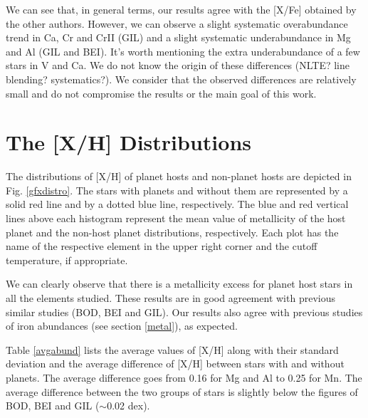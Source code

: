 \documentclass[dvips,12pt,a4paper]{report}
\begin{document}
{{We can see that, in general terms, our results agree with the [X/Fe] obtained by the other authors. However, we can observe a slight systematic overabundance trend in Ca, Cr and CrII (GIL) and a slight systematic underabundance in Mg and Al (GIL and BEI). It's worth mentioning the extra underabundance of a few stars in V and Ca. We do not know the origin of these differences (NLTE? line blending? systematics?). We consider that the observed differences are relatively small and do not compromise the results or the main goal of this work. 







\section{The [X/H] Distributions} 

The distributions of [X/H] of planet hosts and non-planet hosts are depicted in Fig. \ref{gfxdistro}. The stars with planets and without them are represented by a solid red line and by a dotted blue line, respectively. The blue and red vertical lines above each histogram represent the mean value of metallicity of the host planet and the non-host planet distributions, respectively. Each plot has the name of the respective element in the upper right corner and the cutoff temperature, if appropriate.

We can clearly observe that there is a metallicity excess for planet host stars in all the elements studied. These results are in good agreement with previous similar studies (BOD, BEI and GIL). Our results also agree with previous studies of iron abundances (see section \ref{metal}), as expected.

Table \ref{avgabund} lists the average values of [X/H] along with their standard deviation and the average difference of [X/H] between stars with and without planets. The average difference goes from 0.16 for Mg and Al to 0.25 for Mn. %
The average difference between the two groups of stars is slightly below the figures of BOD, BEI and GIL ($\sim$0.02 dex).

}}
\end{document}
